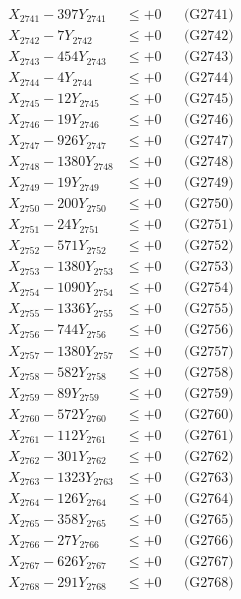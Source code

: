 \documentclass[a4paper,10pt]{article}
\begin{document}
{\begin{align}
\allowbreak
X_{2741} - 397Y_{2741} &\leq +0 && \text{(G2741)} \\
X_{2742} - 7Y_{2742} &\leq +0 && \text{(G2742)} \\
X_{2743} - 454Y_{2743} &\leq +0 && \text{(G2743)} \\
X_{2744} - 4Y_{2744} &\leq +0 && \text{(G2744)} \\
X_{2745} - 12Y_{2745} &\leq +0 && \text{(G2745)} \\
X_{2746} - 19Y_{2746} &\leq +0 && \text{(G2746)} \\
X_{2747} - 926Y_{2747} &\leq +0 && \text{(G2747)} \\
X_{2748} - 1380Y_{2748} &\leq +0 && \text{(G2748)} \\
X_{2749} - 19Y_{2749} &\leq +0 && \text{(G2749)} \\
X_{2750} - 200Y_{2750} &\leq +0 && \text{(G2750)} \\
\allowbreak
X_{2751} - 24Y_{2751} &\leq +0 && \text{(G2751)} \\
X_{2752} - 571Y_{2752} &\leq +0 && \text{(G2752)} \\
X_{2753} - 1380Y_{2753} &\leq +0 && \text{(G2753)} \\
X_{2754} - 1090Y_{2754} &\leq +0 && \text{(G2754)} \\
X_{2755} - 1336Y_{2755} &\leq +0 && \text{(G2755)} \\
X_{2756} - 744Y_{2756} &\leq +0 && \text{(G2756)} \\
X_{2757} - 1380Y_{2757} &\leq +0 && \text{(G2757)} \\
X_{2758} - 582Y_{2758} &\leq +0 && \text{(G2758)} \\
X_{2759} - 89Y_{2759} &\leq +0 && \text{(G2759)} \\
X_{2760} - 572Y_{2760} &\leq +0 && \text{(G2760)} \\
\allowbreak
X_{2761} - 112Y_{2761} &\leq +0 && \text{(G2761)} \\
X_{2762} - 301Y_{2762} &\leq +0 && \text{(G2762)} \\
X_{2763} - 1323Y_{2763} &\leq +0 && \text{(G2763)} \\
X_{2764} - 126Y_{2764} &\leq +0 && \text{(G2764)} \\
X_{2765} - 358Y_{2765} &\leq +0 && \text{(G2765)} \\
X_{2766} - 27Y_{2766} &\leq +0 && \text{(G2766)} \\
X_{2767} - 626Y_{2767} &\leq +0 && \text{(G2767)} \\
X_{2768} - 291Y_{2768} &\leq +0 && \text{(G2768)} \\

\end{align}}
\end{document}
